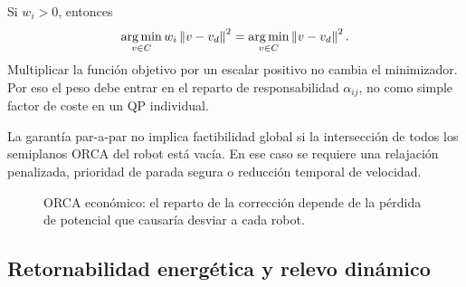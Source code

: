 \begin{observacion}
Si $w_i>0$, entonces
\begin{equation}
  \operatorname*{arg\,min}_{v\in C}w_i\left\|v-v_d\right\|^2
  =
  \operatorname*{arg\,min}_{v\in C}\left\|v-v_d\right\|^2.
  \label{eq:anexo_bug_peso_qp}
\end{equation}
Multiplicar la función objetivo por un escalar positivo no cambia el minimizador. Por
eso el peso debe entrar en el reparto de responsabilidad $\alpha_{ij}$, no como simple
factor de coste en un QP individual.
\end{observacion}

\begin{observacion}
La garantía par-a-par no implica factibilidad global si la intersección de todos los
semiplanos ORCA del robot está vacía. En ese caso se requiere una relajación penalizada,
prioridad de parada segura o reducción temporal de velocidad.
\end{observacion}

\begin{figure}[H]
\centering
{}
\caption{ORCA económico: el reparto de la corrección depende de la pérdida de potencial
que causaría desviar a cada robot.}
\label{fig:anexo_orca}
\end{figure}

\subsection{Retornabilidad energética y relevo dinámico}
\label{subsec:retornabilidad-handover}

